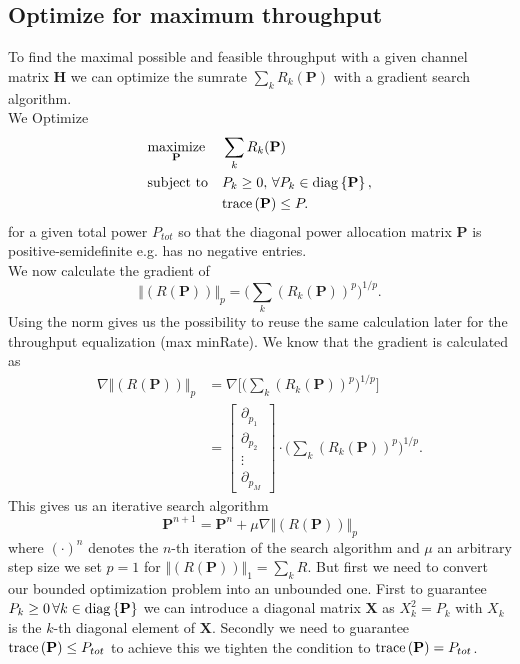 \subsection{Optimize for maximum throughput}
To find the maximal possible and feasible throughput with a given channel matrix $\mathbf{H}$ we can optimize the sumrate $\sum_k{R_k(\mathbf{P})}$ with a gradient search algorithm.\\
We Optimize
\begin{equation}
	\begin{aligned}
		& \underset{\mathbf{P}}{\text{maximize}}
		& & \sum_k{R_k(\mathbf{P})} \\
		& \text{subject to}
		& & P_k\geq 0,\,\forall P_k\in \mathrm{diag}\left\lbrace\mathbf{P}\right\rbrace, \\
		&&& \text{trace}\left(\mathbf{P}\right)\leq P.
	\end{aligned}
\end{equation}
for a given total power $P_{tot}$ so that the diagonal power allocation matrix $\mathbf{P}$ is positive-semidefinite e.g. has no negative entries.\\
We now calculate the gradient of
\begin{equation}
	\bigr\Vert{(R(\mathbf{P}))\bigl\Vert}_p = \Biggr(\sum_k{(R_k(\mathbf{P}))^p}\Biggl)^{1/p}.
\end{equation}
Using the norm gives us the possibility to reuse the same calculation later for the throughput equalization (max minRate).
We know that the gradient is calculated as 
\begin{align}
	\nabla \bigr\Vert{(R(\mathbf{P}))\bigl\Vert}_p &= \nabla \Biggr[ \Biggr(\sum_k{(R_k(\mathbf{P}))^p}\Biggl)^{1/p} \Biggl]\\
	&= \begin{bmatrix}
		\partial_{p_1}\\\partial_{p_2}\\\vdots\\\partial_{p_M}
	\end{bmatrix}
	\cdot \Biggr(\sum_k{(R_k(\mathbf{P}))^p}\Biggl)^{1/p}.
\end{align}
This gives us an iterative search algorithm
\begin{equation}
	\mathbf{P}^{n+1} = \mathbf{P}^n + \mu \nabla \bigr\Vert{(R(\mathbf{P}))\bigl\Vert}_p
\end{equation}
where $(\cdot)^n$ denotes the $n$-th iteration of the search algorithm and $\mu$ an arbitrary step size we set $p = 1$ for $\bigr\Vert{(R(\mathbf{P}))\bigl\Vert}_1 = \sum_k{R}$. 
But first we need to convert our bounded optimization problem into an unbounded one. First to guarantee $P_k \geq 0 \, \forall k\in\mathrm{diag}\left\lbrace\mathbf{P}\right\rbrace$ we can introduce a diagonal matrix $\mathbf{X}$ as $X_k^2 = P_k$ with $X_k$ is the $k$-th diagonal element of $\mathbf{X}$. Secondly we need to guarantee $\text{trace}\left(\mathbf{P}\right)\leq P_{tot}$ to achieve this we tighten the condition to $\text{trace}\left(\mathbf{P}\right)= P_{tot}$.
